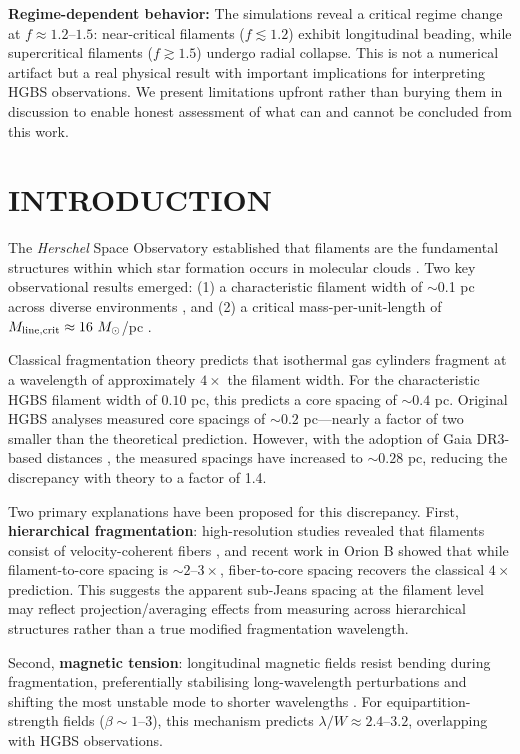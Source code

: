 \documentclass[twoside,twocolumn]{mnras}
\begin{document}
\textbf{Regime-dependent behavior:} The simulations reveal a critical regime change at $f \approx 1.2$--$1.5$: near-critical filaments ($f \lesssim 1.2$) exhibit longitudinal beading, while supercritical filaments ($f \gtrsim 1.5$) undergo radial collapse. This is not a numerical artifact but a real physical result with important implications for interpreting HGBS observations. We present limitations upfront rather than burying them in discussion to enable honest assessment of what can and cannot be concluded from this work.

\section{INTRODUCTION}

The \textit{Herschel} Space Observatory established that filaments are the fundamental structures within which star formation occurs in molecular clouds \citep{Andre2010}. Two key observational results emerged: (1) a characteristic filament width of $\sim$0.1 pc across diverse environments \citep{Arzoumanian2011}, and (2) a critical mass-per-unit-length of $M_{\rm line,crit} \approx 16~M_\odot$/pc \citep{Ostriker1964}.

Classical fragmentation theory \citep{Inutsuka1992} predicts that isothermal gas cylinders fragment at a wavelength of approximately $4\times$ the filament width. For the characteristic HGBS filament width of $0.10$ pc, this predicts a core spacing of $\sim0.4$ pc. Original HGBS analyses measured core spacings of $\sim0.2$ pc—nearly a factor of two smaller than the theoretical prediction. However, with the adoption of Gaia DR3-based distances \citep{Zhang2023}, the measured spacings have increased to $\sim0.28$ pc, reducing the discrepancy with theory to a factor of 1.4.

Two primary explanations have been proposed for this discrepancy. First, \textbf{hierarchical fragmentation}: high-resolution studies revealed that filaments consist of velocity-coherent fibers \citep{Hacar2013}, and recent work in Orion B \citep{Yang2024} showed that while filament-to-core spacing is $\sim2$--$3\times$, fiber-to-core spacing recovers the classical $4\times$ prediction. This suggests the apparent sub-Jeans spacing at the filament level may reflect projection/averaging effects from measuring across hierarchical structures rather than a true modified fragmentation wavelength.

Second, \textbf{magnetic tension}: longitudinal magnetic fields resist bending during fragmentation, preferentially stabilising long-wavelength perturbations and shifting the most unstable mode to shorter wavelengths \citep{Nakamura1993}. For equipartition-strength fields ($\beta \sim 1$--$3$), this mechanism predicts $\lambda/W \approx 2.4$--$3.2$, overlapping with HGBS observations.
\end{document}
